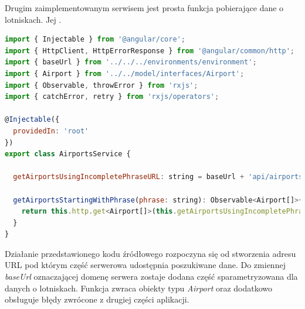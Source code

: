 \documentclass[12pt, twoside]{report}
\begin{document}
Drugim zaimplementowanym serwisem jest prosta funkcja pobierające dane o lotniskach. Jej . 
\begin{lstlisting}[language=JavaScript, caption= Kod źródłowy funkcji pobierającej dane lotnisk]
import { Injectable } from '@angular/core';
import { HttpClient, HttpErrorResponse } from '@angular/common/http';
import { baseUrl } from '../../../environments/environment';
import { Airport } from '../../model/interfaces/Airport';
import { Observable, throwError } from 'rxjs';
import { catchError, retry } from 'rxjs/operators';

@Injectable({
  providedIn: 'root'
})
export class AirportsService {

  getAirportsUsingIncompletePhraseURL: string = baseUrl + 'api/airports/getAirportsStartingWith/';

  getAirportsStartingWithPhrase(phrase: string): Observable<Airport[]>{
    return this.http.get<Airport[]>(this.getAirportsUsingIncompletePhraseURL + phrase).pipe(catchError(this.handleError)); 
  }  
}
\end{lstlisting}
Działanie przedstawionego kodu źródłowego rozpoczyna się od stworzenia adresu URL pod którym część serwerowa udostępnia poszukiwane dane. Do zmiennej \textit{baseUrl} oznaczającej domenę serwera zostaje dodana część sparametryzowana dla danych o lotniskach. Funkcja zwraca obiekty typu \textit{Airport} oraz dodatkowo obsługuje błędy zwrócone z drugiej części aplikacji.
\end{document}

